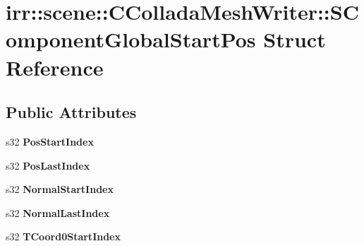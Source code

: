 \hypertarget{structirr_1_1scene_1_1_c_collada_mesh_writer_1_1_s_component_global_start_pos}{\section{irr\-:\-:scene\-:\-:C\-Collada\-Mesh\-Writer\-:\-:S\-Component\-Global\-Start\-Pos Struct Reference}
\label{structirr_1_1scene_1_1_c_collada_mesh_writer_1_1_s_component_global_start_pos}
}
\subsection*{Public Attributes}
\begin{DoxyCompactItemize}
\item 
\hypertarget{structirr_1_1scene_1_1_c_collada_mesh_writer_1_1_s_component_global_start_pos_a6e7fc84931d1631f774f09eef776160b}{s32 {\bfseries Pos\-Start\-Index}}\label{structirr_1_1scene_1_1_c_collada_mesh_writer_1_1_s_component_global_start_pos_a6e7fc84931d1631f774f09eef776160b}

\item 
\hypertarget{structirr_1_1scene_1_1_c_collada_mesh_writer_1_1_s_component_global_start_pos_a4bb7658e9af372a3c114e17ea43236f7}{s32 {\bfseries Pos\-Last\-Index}}\label{structirr_1_1scene_1_1_c_collada_mesh_writer_1_1_s_component_global_start_pos_a4bb7658e9af372a3c114e17ea43236f7}

\item 
\hypertarget{structirr_1_1scene_1_1_c_collada_mesh_writer_1_1_s_component_global_start_pos_a1acc70b5d0f8218165d9950706c9c5ae}{s32 {\bfseries Normal\-Start\-Index}}\label{structirr_1_1scene_1_1_c_collada_mesh_writer_1_1_s_component_global_start_pos_a1acc70b5d0f8218165d9950706c9c5ae}

\item 
\hypertarget{structirr_1_1scene_1_1_c_collada_mesh_writer_1_1_s_component_global_start_pos_ac299f26784c403db137454deb7ec06eb}{s32 {\bfseries Normal\-Last\-Index}}\label{structirr_1_1scene_1_1_c_collada_mesh_writer_1_1_s_component_global_start_pos_ac299f26784c403db137454deb7ec06eb}

\item 
\hypertarget{structirr_1_1scene_1_1_c_collada_mesh_writer_1_1_s_component_global_start_pos_ad7d744da1d1ff2b931b86eceadd2673f}{s32 {\bfseries T\-Coord0\-Start\-Index}}\label{structirr_1_1scene_1_1_c_collada_mesh_writer_1_1_s_component_global_start_pos_ad7d744da1d1ff2b931b86eceadd2673f}


\end{DoxyCompactItemize}
